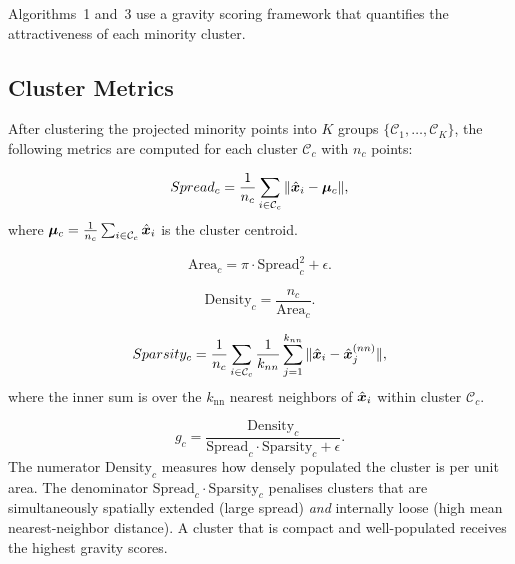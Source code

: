 Algorithms~1 and~3 use a gravity scoring framework that quantifies the attractiveness of each minority cluster.

\subsection{Cluster Metrics}

After clustering the projected minority points into $K$ groups $\{\mathcal{C}_1, \ldots, \mathcal{C}_K\}$, the following metrics are computed for each cluster $\mathcal{C}_c$ with $n_c$ points:

\begin{definition}
\begin{equation}
    Spread_c = \frac{1}{n_c} \sum_{i \in \mathcal{C}_c} \|\hat{\bm{x}}_i - \boldsymbol{\mu}_c\|,
    \label{eq:spread}
\end{equation}
where $\boldsymbol{\mu}_c = \frac{1}{n_c}\sum_{i \in \mathcal{C}_c} \hat{\bm{x}}_i$ is the cluster centroid.
\end{definition}

\begin{definition}
\begin{equation}
    \mathrm{Area}_c = \pi \cdot \mathrm{Spread}_c^2 + \epsilon.
    \label{eq:area}
\end{equation}
\end{definition}

\begin{definition}
\begin{equation}
    \mathrm{Density}_c = \frac{n_c}{\mathrm{Area}_c}.
    \label{eq:density}
\end{equation}
\end{definition}

\begin{definition}
\begin{equation}
    Sparsity_c = \frac{1}{n_c} \sum_{i \in \mathcal{C}_c} \frac{1}{k_{nn}} \sum_{j=1}^{k_{nn}} \|\hat{\bm{x}}_i - \hat{\bm{x}}_j^{(nn)}\|,
    \label{eq:sparsity}
\end{equation}
where the inner sum is over the $k_{\text{nn}}$ nearest neighbors of $\hat{\bm{x}}_i$ within cluster $\mathcal{C}_c$.
\end{definition}

\begin{definition}
\begin{equation}
    g_c = \frac{\mathrm{Density}_c}{\mathrm{Spread}_c \cdot \mathrm{Sparsity}_c + \epsilon}.
    \label{eq:gravity}
\end{equation}
The numerator $\mathrm{Density}_c$ measures how densely populated the cluster is per unit area.
The denominator $\mathrm{Spread}_c \cdot \mathrm{Sparsity}_c$ penalises clusters that are simultaneously spatially extended (large spread) \emph{and} internally loose (high mean nearest-neighbor distance).
A cluster that is compact and well-populated receives the highest gravity scores.
\end{definition}

